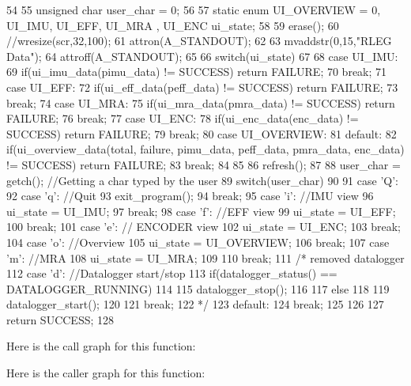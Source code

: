 \begin{DoxyCode}
54 {
55         unsigned char user_char = 0;
56 
57         static enum {UI_OVERVIEW = 0, UI_IMU, UI_EFF, UI_MRA , UI_ENC} ui_state;
58 
59         erase();
60         //wresize(scr,32,100);
61         attron(A_STANDOUT);
62 
63         mvaddstr(0,15,"RLEG Data");
64         attroff(A_STANDOUT);
65 
66         switch(ui_state)
67         {
68                 case UI_IMU:
69                         if(ui_imu_data(pimu_data) != SUCCESS) return FAILURE;
70                         break;
71                 case UI_EFF:
72                         if(ui_eff_data(peff_data) != SUCCESS) return FAILURE;
73                         break;
74                 case UI_MRA:
75                         if(ui_mra_data(pmra_data) != SUCCESS) return FAILURE;
76                         break;
77         case UI_ENC:
78                         if(ui_enc_data(enc_data) != SUCCESS) return FAILURE;
79                         break;
80                 case UI_OVERVIEW:
81                 default:
82                         if(ui_overview_data(total, failure, pimu_data, peff_data,
       pmra_data, enc_data) != SUCCESS) return FAILURE;
83                         break;
84         }
85 
86         refresh();
87 
88         user_char = getch(); //Getting a char typed by the user
89         switch(user_char)
90         {
91                 case 'Q':
92                 case 'q': //Quit
93                         exit_program();
94                         break;
95                 case 'i': //IMU view
96                         ui_state = UI_IMU;
97                         break;
98                 case 'f': //EFF view
99                         ui_state = UI_EFF;
100                         break;
101             case 'e': // ENCODER view
102                     ui_state = UI_ENC;
103                     break;
104                 case 'o': //Overview
105                         ui_state = UI_OVERVIEW;
106                         break;
107                 case 'm': //MRA
108                         ui_state = UI_MRA;
109                 
110                         break;
111                 /* removed datalogger
112                 case 'd': //Datalogger start/stop
113                   if(datalogger_status() == DATALOGGER_RUNNING)
114                   {
115                     datalogger_stop();
116                   }
117                   else
118                   {
119                     datalogger_start();
120                   }
121                   break;
122                 */
123                default:
124                  break;
125         }
126 
127         return SUCCESS;
128 }
\end{DoxyCode}




Here is the call graph for this function:



Here is the caller graph for this function:

